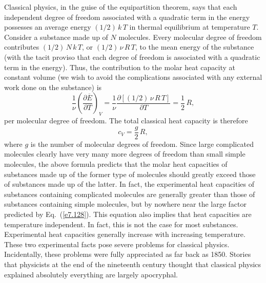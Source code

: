Classical physics, in the guise of the equipartition theorem, says that each 
independent degree of freedom associated with a quadratic term in the energy
possesses an average energy $(1/2)\, k\,T$ in thermal equilibrium at temperature
$T$. Consider a substance made up of $N$ molecules. Every molecular
degree of freedom  contributes $(1/2)\,N\,k\,T$,
or $(1/2)\,\nu \,R\, T$, to the mean energy of the substance (with the tacit proviso
that each degree of freedom is associated with a quadratic term in the energy).
Thus, the contribution to the molar heat capacity at constant volume (we wish to
avoid the complications associated with any external work done on the substance) is
\begin{equation}
\frac{1}{\nu}\left(
\frac{\partial \overline{E}}{\partial T}\right)_V = 
\frac{1}{\nu} \frac{\partial[ (1/2)\, \nu\, R\,T] }{\partial T}= \frac{1}{2}\, R,
\end{equation}
per molecular degree of freedom. The total classical heat capacity is
therefore
\begin{equation}
c_V = \frac{g}{2} \,R,\label{e7.128}
\end{equation}
where $g$ is the number of molecular degrees of freedom. Since large complicated
molecules clearly have very many more degrees of freedom than small simple
molecules, the above formula predicts that the molar
heat capacities of substances
made up of the former type of molecules
should greatly exceed those  of substances made
up of the latter. In fact, the experimental heat capacities of substances containing
complicated molecules are generally greater than those of 
substances containing simple molecules,
but by nowhere near the large factor predicted by Eq.~(\ref{e7.128}). This  equation also
implies  that heat capacities are  temperature independent. In fact,
this is not the case for most substances. 
Experimental heat capacities  generally increase with
increasing temperature. These two experimental
facts pose severe problems for classical physics.
Incidentally, these problems 
 were fully appreciated as far back as 1850. Stories that physicists at the end
 of the nineteenth
century
thought that classical physics explained absolutely everything are largely apocryphal.


